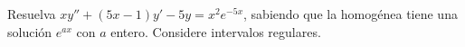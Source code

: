 Resuelva $xy''+(5x-1)y'-5y=x^2e^{-5x}$, sabiendo que la homogénea tiene una solución $e^{ax}$ con $a$ entero. Considere intervalos regulares.
